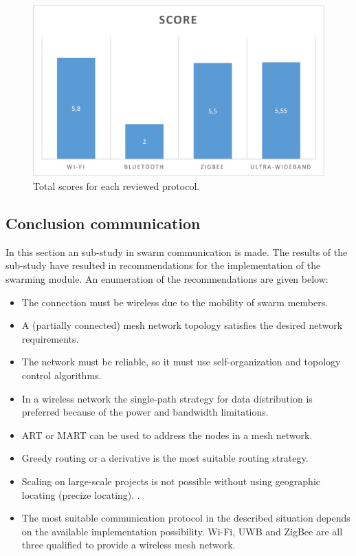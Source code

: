 \documentclass[10pt,a4paper]{article}
\begin{document}
\begin{figure}[H]
   \centering
   \includegraphics[width=1\textwidth]{protocolcomparison}
   \caption{Total scores for each reviewed protocol.}
   \label{fig:protocolcomparison}
\end{figure}


\newpage
\subsection{Conclusion communication}
In this section an sub-study in swarm communication is made. The results of the sub-study have resulted in recommendations for the implementation of the swarming module. An enumeration of the recommendations are given below:
\begin{itemize}
\setlength\itemsep{0em}
    \item The connection must be wireless due to the mobility of swarm members.
    \item A (partially connected) mesh network topology satisfies the desired network requirements.
    \item The network must be reliable, so it must use self-organization and topology control algorithms. \cite{WMN1}
    \item In a wireless network the single-path strategy for data distribution is preferred because of the power and bandwidth limitations. \cite{position-based}
    \item ART or MART can be used to address the nodes in a mesh network.
    \item Greedy routing or a derivative is the most suitable routing strategy.
    \item Scaling on large-scale projects is not possible without using geographic locating (precize locating). \cite{geographicalrouting}\cite{scalablelocation}. 
    \item The most suitable communication protocol in the described situation depends on the available implementation possibility. Wi-Fi, UWB and ZigBee are all three qualified to provide a wireless mesh network.
\end{itemize}
\end{document}
